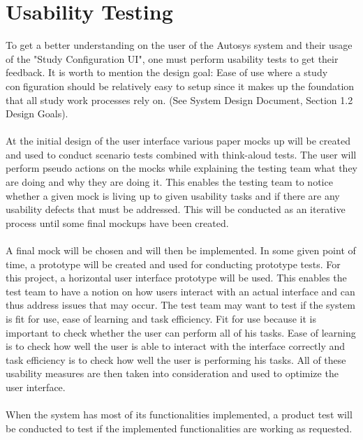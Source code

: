 \section{Usability Testing}
To get a better understanding on the user of the Autosys system and their usage of the "Study Configuration UI", one must perform usability tests to get their feedback. It is worth to mention the design goal: Ease of use where a study configuration should be relatively easy to setup since it makes up the foundation that all study work processes rely on. (See System Design Document, Section 1.2 Design Goals).\\\\
At the initial  design of the user interface various paper mocks up will be created and used to conduct scenario tests combined with think-aloud tests. The user will perform pseudo actions on the mocks while explaining the testing team what they are doing and why they are doing it. This enables the testing team to notice whether a given mock is living up to given usability tasks and if there are any usability defects that must be addressed. This will be conducted as an iterative process until some final mockups have been created.  \\\\A final mock will be chosen and will then be implemented. In some given point of time, a prototype will be created and used for conducting prototype tests.  For this project, a horizontal user interface prototype will be used. This enables the test team to have a notion on how users interact with an actual interface and can thus address issues that may occur.  The test team may want to test if the system is fit for use, ease of learning and task efficiency. Fit for use because it is important to check whether the user can perform all of his tasks. Ease of learning is to check how well the user is able to interact with the interface correctly and task efficiency is to check how well the user is performing his tasks. All of these usability measures are then taken into consideration and used to optimize the user interface. \\\\When the system has most of its functionalities  implemented, a product test will be conducted to test if the implemented functionalities are working as requested.



